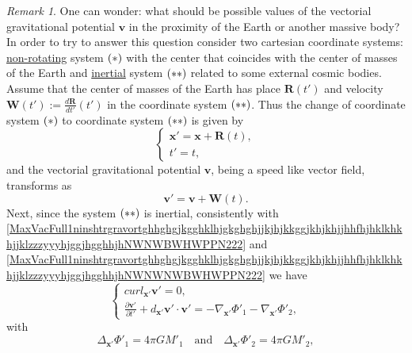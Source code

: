 \documentclass{article}
\theoremstyle{definition}
\theoremstyle{remark}
\newtheorem{remark}{Remark}[section]
\renewcommand{\vec}[1]{\mathbf{#1}}
\newcommand{\er}{\eqref}
\newcommand{\er}{\eqref}
\newtheorem{remark}{Remark}
\begin{document}
\begin{remark}\label{gygygygyggjh}
One can wonder: what should be possible values of the vectorial
gravitational potential $\vec v$ in the proximity of the Earth or
another massive body? In order to try to answer this question
consider two cartesian coordinate systems: \underline{non-rotating}
system $\bf(*)$ with the center that coincides with the center of
masses of the Earth and \underline{inertial} system $\bf(**)$
related to some external cosmic bodies. Assume that the center of
masses of the Earth has place $\vec R(t')$ and velocity $\vec
W(t'):=\frac{d\vec R}{dt'}(t')$ in the coordinate system $\bf(**)$.
Thus the change of coordinate system $\bf(*)$ to coordinate system
$\bf(**)$ is given by
\begin{equation}\label{hjjgghghghyu}
\begin{cases}
\vec x'=\vec x+\vec R(t),\\
t'=t,
\end{cases}
\end{equation}
and the vectorial gravitational potential $\vec v$, being a speed
like vector field, transforms as
\begin{equation}\label{hjjgghghghyulll}
\vec v'=\vec v+\vec W(t).
\end{equation}
Next, since the system $\bf(**)$ is inertial, consistently with
\er{MaxVacFull1ninshtrgravortghhghgjkgghklhjgkghghjjkjhjkkggjkhjkhjjhhfhjhklkhkhjjklzzzyyyhjggjhgghhjhNWNWBWHWPPN222}
and
\er{MaxVacFull1ninshtrgravortghhghgjkgghklhjgkghghjjkjhjkkggjkhjkhjjhhfhjhklkhkhjjklzzzyyyhjggjhgghhjhNWNWNWBWHWPPN222}
we have
\begin{equation}
\label{MaxVacFull1ninshtrgravortghhghgjkgghklhjgkghghjjkjhjkkggjkhjkhjjhhfhjhklkhkhjjklzzzyyyhjggjhgghhjhNWNWBWHWPPN222kkk}
\begin{cases}
curl_{\vec x'}\vec v'= 0,\\
\frac{\partial\vec v'}{\partial t'}+d_{\vec x'}\vec v'\cdot\vec v'=
-\nabla_{\vec x'}\Phi'_1-\nabla_{\vec x'}\Phi'_2,
\end{cases}
\end{equation}
with
\begin{equation}
\label{MaxVacFull1ninshtrgravortghhghgjkgghklhjgkghghjjkjhjkkggjkhjkhjjhhfhjhklkhkhjjklzzzyyyhjggjhgghhjhNWNWNWBWHWPPN222kkk}
\Delta_{\vec x'}\Phi'_1=4\pi GM'_1\quad\text{and}\quad\Delta_{\vec
x'}\Phi'_2=4\pi GM'_2,
\end{equation}

\end{remark}
\end{document}
